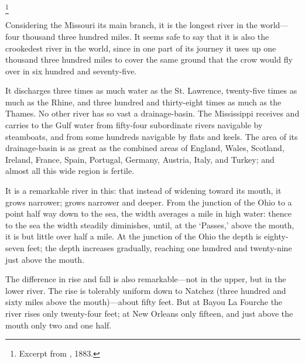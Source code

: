 \documentclass[../interior-demo.tex]{subfiles}
\begin{document}
\begin{upperpage}
\footnote{Excerpt from , 1883.}
\null
\begin{blockindent}[4,4]
\end{blockindent}
\end{upperpage}



Considering the
Missouri its main branch, it is the longest river in the world---four
thousand three hundred miles. It seems safe to say that it is also the
crookedest river in the world, since in one part of its journey it uses
up one thousand three hundred miles to cover the same ground that the
crow would fly over in six hundred and seventy-five.

It discharges three
times as much water as the St. Lawrence, twenty-five times as much
as the Rhine, and three hundred and thirty-eight times as much as the
Thames. No other river has so vast a drainage-basin. The
Mississippi receives\edit{}{,} and carries to the Gulf\edit{}{,} water from
fifty-four subordinate rivers navigable by steamboats,
and from some hundreds navigable by flats and keels.
The area of its drainage-basin is as great as the combined areas of England,
Wales, Scotland, Ireland, France, Spain, Portugal, Germany, Austria, Italy,
and Turkey; and almost all this wide region is fertile.

It is a remarkable river in this: that instead of widening toward its
mouth, it grows narrower; grows narrower and deeper. From the junction
of the Ohio to a point half way down to the sea, the width averages a
mile in high water: thence to the sea the width steadily diminishes,
until, at the `Passes,' above the mouth, it is but little over half
a mile. At the junction of the Ohio the  depth is
eighty-seven feet; the depth increases gradually, reaching one hundred
and twenty-nine just above the mouth.

The difference in rise and fall is also remarkable---not in the upper,
but in the lower river. The rise is tolerably uniform down to Natchez
(three hundred and sixty miles above the mouth)---about fifty feet.
But at Bayou La Fourche the river rises only twenty-four feet; at New
Orleans only fifteen, and just above the mouth only two and one half.
\end{document}
